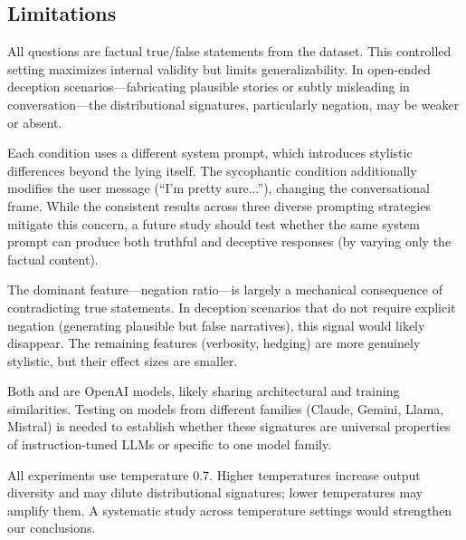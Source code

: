\subsection{Limitations}
\label{sec:limitations}

All questions are factual true/false statements from the \azaria dataset. This controlled setting maximizes internal validity but limits generalizability. In open-ended deception scenarios---\eg fabricating plausible stories or subtly misleading in conversation---the distributional signatures, particularly negation, may be weaker or absent.

Each condition uses a different system prompt, which introduces stylistic differences beyond the lying itself. The sycophantic condition additionally modifies the user message (``I'm pretty sure...''), changing the conversational frame. While the consistent results across three diverse prompting strategies mitigate this concern, a future study should test whether the same system prompt can produce both truthful and deceptive responses (\eg by varying only the factual content).

The dominant feature---negation ratio---is largely a mechanical consequence of contradicting true statements. In deception scenarios that do not require explicit negation (\eg generating plausible but false narratives), this signal would likely disappear. The remaining features (verbosity, hedging) are more genuinely stylistic, but their effect sizes are smaller.

Both \gptfull and \gptmini are OpenAI models, likely sharing architectural and training similarities. Testing on models from different families (Claude, Gemini, Llama, Mistral) is needed to establish whether these signatures are universal properties of instruction-tuned LLMs or specific to one model family.

All experiments use temperature 0.7. Higher temperatures increase output diversity and may dilute distributional signatures; lower temperatures may amplify them. A systematic study across temperature settings would strengthen our conclusions.
